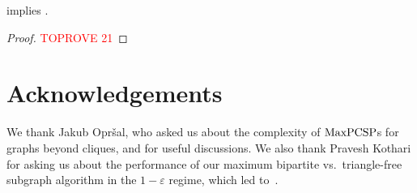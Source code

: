 \documentclass[a4paper,11pt, DIV=11]{scrartcl}
\renewcommand{\epsilon}{\varepsilon}
\DeclareMathOperator{\maxPCSP}{\textup{MaxPCSP}}
\theoremstyle{plain}
\theoremstyle{definition}
\begin{document}
\begin{theorem}
     implies .
\end{theorem}
\begin{proof}\textcolor{red}{TOPROVE 21}\end{proof}

\section*{Acknowledgements}

We thank Jakub Opr\v{s}al, who asked us about the complexity of $\maxPCSP$s for
graphs beyond cliques, and for useful discussions. We also thank Pravesh Kothari
for asking us about the performance of our maximum bipartite vs.~triangle-free
subgraph algorithm in the $1 - \epsilon$ regime, which led to~.

{


}
\end{document}

